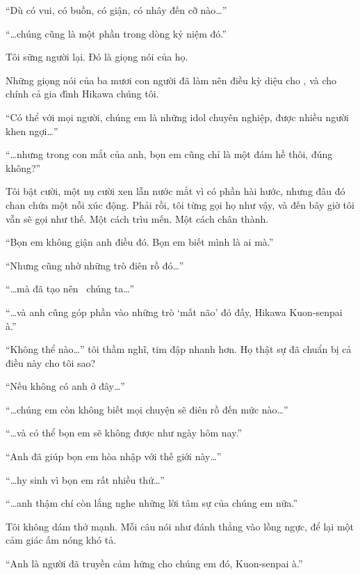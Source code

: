 \documentclass[../main.tex]{subfiles}
\begin{document}
``Dù có vui, có buồn, có giận, có nhây đến cỡ nào\dots''

``\dots chúng cũng là một phần trong dòng kỷ niệm đó.''

\il

Tôi sững người lại. Đó là giọng nói của họ.

Những giọng nói của ba mươi con người đã làm nên điều kỳ diệu cho \hll, và cho chính cả gia đình Hikawa chúng tôi.

\il

``Có thể với mọi người, chúng em là những idol chuyên nghiệp, được nhiều người khen ngợi\dots''

``\dots nhưng trong con mắt của anh, bọn em cũng chỉ là một đám hề thôi, đúng không?''

\il

Tôi bật cười, một nụ cười xen lẫn nước mắt vì có phần hài hước, nhưng đâu đó chan chứa một nỗi xúc động. Phải rồi, tôi từng gọi họ như vậy, và đến bây giờ tôi vẫn sẽ gọi như thế. Một cách trìu mến. Một cách chân thành.

\il

``Bọn em không giận anh điều đó. Bọn em biết mình là ai mà.''

``Nhưng cũng nhờ những trò điên rồ đó\dots''

``\dots mà đã tạo nên \hll\ chúng ta\dots''

``\dots và anh cũng góp phần vào những trò `mất não' đó đấy, Hikawa Kuon-senpai à.''

\il

``Không thể nào\dots'' tôi thầm nghĩ, tim đập nhanh hơn. Họ thật sự đã chuẩn bị cả điều này cho tôi sao?

\il

``Nếu không có anh ở đây\dots''

``\dots chúng em còn không biết mọi chuyện sẽ điên rồ đến mức nào\dots''

``\dots và có thể bọn em sẽ không được như ngày hôm nay.''

``Anh đã giúp bọn em hòa nhập với thế giới này\dots''

``\dots hy sinh vì bọn em rất nhiều thứ\dots''

``\dots anh thậm chí còn lắng nghe những lời tâm sự của chúng em nữa.''

\il

Tôi không dám thở mạnh. Mỗi câu nói như đánh thẳng vào lồng ngực, để lại một cảm giác ấm nóng khó tả.

\il

``Anh là người đã truyền cảm hứng cho chúng em đó, Kuon-senpai à.''
\end{document}
